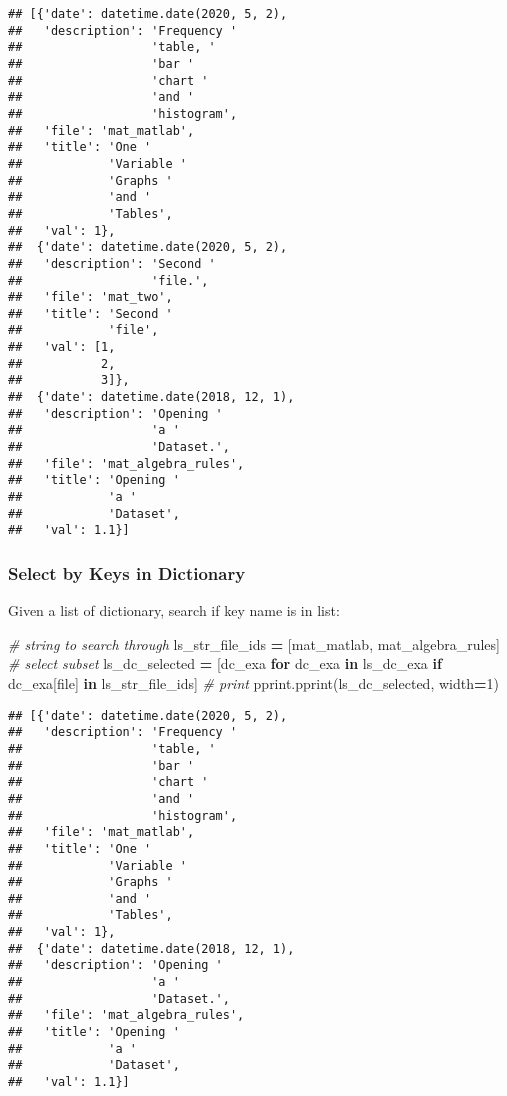 \documentclass[
]{book}
\newenvironment{Shaded}{\begin{snugshade}}{\end{snugshade}}
\newcommand{\CommentTok}[1]{\textcolor[rgb]{0.56,0.35,0.01}{\textit{#1}}}
\newcommand{\ControlFlowTok}[1]{\textcolor[rgb]{0.13,0.29,0.53}{\textbf{#1}}}
\newcommand{\DecValTok}[1]{\textcolor[rgb]{0.00,0.00,0.81}{#1}}
\newcommand{\KeywordTok}[1]{\textcolor[rgb]{0.13,0.29,0.53}{\textbf{#1}}}
\newcommand{\NormalTok}[1]{#1}
\newcommand{\OperatorTok}[1]{\textcolor[rgb]{0.81,0.36,0.00}{\textbf{#1}}}
\newcommand{\StringTok}[1]{\textcolor[rgb]{0.31,0.60,0.02}{#1}}
\begin{document}
\begin{verbatim}
## [{'date': datetime.date(2020, 5, 2),
##   'description': 'Frequency '
##                  'table, '
##                  'bar '
##                  'chart '
##                  'and '
##                  'histogram',
##   'file': 'mat_matlab',
##   'title': 'One '
##            'Variable '
##            'Graphs '
##            'and '
##            'Tables',
##   'val': 1},
##  {'date': datetime.date(2020, 5, 2),
##   'description': 'Second '
##                  'file.',
##   'file': 'mat_two',
##   'title': 'Second '
##            'file',
##   'val': [1,
##           2,
##           3]},
##  {'date': datetime.date(2018, 12, 1),
##   'description': 'Opening '
##                  'a '
##                  'Dataset.',
##   'file': 'mat_algebra_rules',
##   'title': 'Opening '
##            'a '
##            'Dataset',
##   'val': 1.1}]
\end{verbatim}

\hypertarget{select-by-keys-in-dictionary}{%
\subsubsection{Select by Keys in Dictionary}\label{select-by-keys-in-dictionary}}

Given a list of dictionary, search if key name is in list:

\begin{Shaded}
\begin{Highlighting}[]
\CommentTok{\# string to search through}
\NormalTok{ls\_str\_file\_ids }\OperatorTok{=}\NormalTok{ [}\StringTok{\textquotesingle{}mat\_matlab\textquotesingle{}}\NormalTok{, }\StringTok{\textquotesingle{}mat\_algebra\_rules\textquotesingle{}}\NormalTok{]}
\CommentTok{\# select subset}
\NormalTok{ls\_dc\_selected }\OperatorTok{=}\NormalTok{ [dc\_exa}
                  \ControlFlowTok{for}\NormalTok{ dc\_exa }\KeywordTok{in}\NormalTok{ ls\_dc\_exa}
                  \ControlFlowTok{if}\NormalTok{ dc\_exa[}\StringTok{\textquotesingle{}file\textquotesingle{}}\NormalTok{] }\KeywordTok{in}\NormalTok{ ls\_str\_file\_ids]}
\CommentTok{\# print}
\NormalTok{pprint.pprint(ls\_dc\_selected, width}\OperatorTok{=}\DecValTok{1}\NormalTok{)}
\end{Highlighting}
\end{Shaded}

\begin{verbatim}
## [{'date': datetime.date(2020, 5, 2),
##   'description': 'Frequency '
##                  'table, '
##                  'bar '
##                  'chart '
##                  'and '
##                  'histogram',
##   'file': 'mat_matlab',
##   'title': 'One '
##            'Variable '
##            'Graphs '
##            'and '
##            'Tables',
##   'val': 1},
##  {'date': datetime.date(2018, 12, 1),
##   'description': 'Opening '
##                  'a '
##                  'Dataset.',
##   'file': 'mat_algebra_rules',
##   'title': 'Opening '
##            'a '
##            'Dataset',
##   'val': 1.1}]
\end{verbatim}
\end{document}
